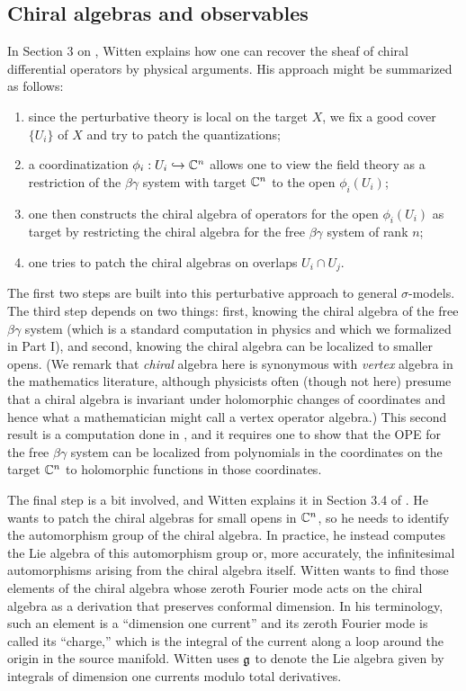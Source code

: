 \subsection{Chiral algebras and observables}

In Section 3 on \cite{WittenCDO}, Witten explains how one can recover the sheaf of chiral differential operators by physical arguments.
His approach might be summarized as follows:
\begin{enumerate}
\item since the perturbative theory is local on the target $X$, we fix a good cover $\{U_i\}$ of $X$ and try to patch the quantizations;
\item a coordinatization $\phi_i: U_i \hookrightarrow \mathbb C^n$ allows one to view the field theory as a restriction of the $\beta\gamma$ system with target $\mathbb C^n$ to the open $\phi_i(U_i)$; 
\item one then constructs the chiral algebra of operators for the open $\phi_i(U_i)$ as target by restricting the chiral algebra for the free $\beta\gamma$ system of rank $n$;
\item one tries to patch the chiral algebras on overlaps $U_i \cap U_j$.
\end{enumerate}
The first two steps are built into this perturbative approach to general $\sigma$-models.
The third step depends on two things: 
first, knowing the chiral algebra of the free $\beta\gamma$ system 
(which is a standard computation in physics and which we formalized in Part I), 
and second, knowing the chiral algebra can be localized to smaller opens.
(We remark that {\em chiral} algebra here is synonymous with {\em vertex} algebra in the mathematics literature,
although physicists often (though not here) presume that a chiral algebra is invariant under holomorphic changes of coordinates 
and hence what a mathematician might call a vertex operator algebra.)
This second result is a computation done in \cite{MSV, GMS},
and it requires one to show that the OPE for the free $\beta\gamma$ system can be localized from polynomials in the coordinates on the target $\mathbb C^n$ to holomorphic functions in those coordinates.

The final step is a bit involved, and Witten explains it in Section 3.4 of \cite{WittenCDO}.
He wants to patch the chiral algebras for small opens in $\mathbb C^n$,
so he needs to identify the automorphism group of the chiral algebra.
In practice, he instead computes the Lie algebra of this automorphism group 
or, more accurately, the infinitesimal automorphisms arising from the chiral algebra itself.
Witten wants to find those elements of the chiral algebra whose zeroth Fourier mode 
acts on the chiral algebra as a derivation that preserves conformal dimension.
In his terminology, such an element is a ``dimension one current'' and 
its zeroth Fourier mode is called its ``charge,'' 
which is the integral of the current along a loop around the origin in the source manifold.
Witten uses $\mathfrak g$ to denote the Lie algebra given by integrals of dimension one currents modulo total derivatives.


